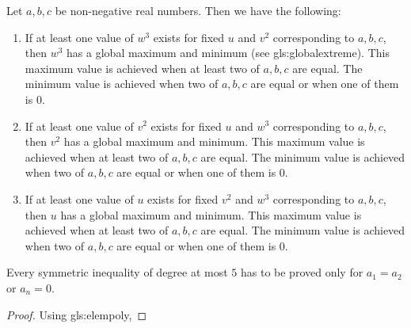 \documentclass{subfile}
\begin{document}
		\begin{theorem}\label{thm:tej}
			Let $a,b,c$ be non-negative real numbers. Then we have the following:
				\begin{enumerate}
					\item If at least one value of $w^{3}$ exists for fixed $u$ and $v^{2}$ corresponding to $a,b,c$, then $w^{3}$ has a global maximum and minimum (see \gls{gls:globalextreme}). This maximum value is achieved when at least two of $a,b,c$ are equal. The minimum value is achieved when two of $a,b,c$ are equal or when one of them is $0$.
					\item If at least one value of $v^{2}$ exists for fixed $u$ and $w^{3}$ corresponding to $a,b,c$, then $v^{2}$ has a global maximum and minimum. This maximum value is achieved when at least two of $a,b,c$ are equal. The minimum value is achieved when two of $a,b,c$ are equal or when one of them is $0$.
					\item If at least one value of $u$ exists for fixed $v^{2}$ and $w^{3}$ corresponding to $a,b,c$, then $u$ has a global maximum and minimum. This maximum value is achieved when at least two of $a,b,c$ are equal. The minimum value is achieved when two of $a,b,c$ are equal or when one of them is $0$.
				\end{enumerate}
		\end{theorem}

		\begin{theorem}
			Every symmetric inequality of degree at most $5$ has to be proved only for $a_{1}=a_{2}$ or $a_{n}=0$.
		\end{theorem}

		\begin{proof}
			Using \gls{gls:elempoly},
		\end{proof}
\end{document}
